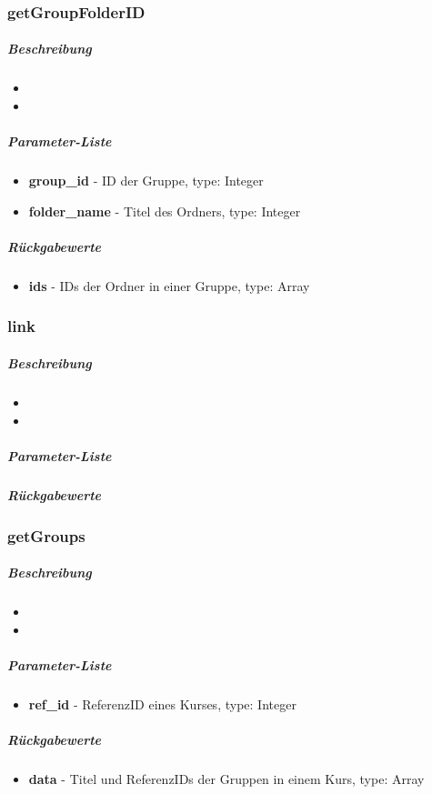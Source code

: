 \subsubsection*{getGroupFolderID}\label{getGroupFolderIDLGUI}
\subparagraph{Beschreibung}
\begin{itemize}
	\item[] \noindent{} 
	\item[] 
\end{itemize}
\subparagraph{Parameter-Liste}
\begin{itemize}
	\item[] \textbf{group\_id} - ID der Gruppe, type: Integer
	\item[] \textbf{folder\_name} - Titel des Ordners, type: Integer
\end{itemize}
\subparagraph{Rückgabewerte}
\begin{itemize}
	\item[] \textbf{ids} - IDs der Ordner in einer Gruppe, type: Array
\end{itemize}

\subsubsection*{link}\label{linkLGUI}
\subparagraph{Beschreibung}
\begin{itemize}
	\item[] \noindent{} 
	\item[] 
\end{itemize}
\subparagraph{Parameter-Liste}
\subparagraph{Rückgabewerte}

\subsubsection*{getGroups}\label{getGroupsLGUI}
\subparagraph{Beschreibung}
\begin{itemize}
	\item[] \noindent{} 
	\item[] 
\end{itemize}
\subparagraph{Parameter-Liste}
\begin{itemize}
	\item[] \textbf{ref\_id} - ReferenzID eines Kurses, type: Integer
\end{itemize}
\subparagraph{Rückgabewerte}
\begin{itemize}
	\item[] \textbf{data} - Titel und ReferenzIDs der Gruppen in einem Kurs, type: Array
\end{itemize}

